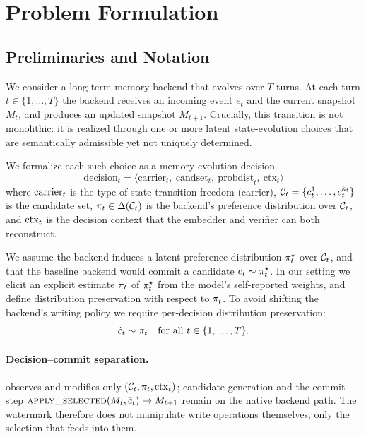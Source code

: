 
\section{Problem Formulation}
\label{sec:problem}

\subsection{Preliminaries and Notation}
\label{sec:problem-prelim}
We consider a long-term memory backend that evolves over $T$ turns.
At each turn $t\in\{1,\ldots,T\}$ the backend receives an incoming event
$e_t$ and the current snapshot $M_t$, and produces an updated snapshot
$M_{t+1}$. Crucially, this transition is not monolithic: it is realized
through one or more latent state-evolution choices that are semantically
admissible yet not uniquely determined.

We formalize each such choice as a memory-evolution decision
\begin{equation}
\mathrm{decision}_{t} = \langle \mathrm{carrier}_{t},\ \mathrm{candset}_{t},\ \mathrm{probdist}_{t},\ \mathrm{ctx}_{t} \rangle
\end{equation}
where $\mathrm{carrier}_t$ is the type of state-transition freedom (carrier),
$\mathcal{C}_{t}=\{c_{t}^{1},\ldots,c_{t}^{k_{t}}\}$ is the candidate set,
$\pi_t\in\Delta(\mathcal{C}_t)$ is the backend's preference distribution
over $\mathcal{C}_t$, and $\mathrm{ctx}_t$ is the decision context that the embedder
and verifier can both reconstruct.

We assume the backend induces a latent preference distribution
$\pi_t^\star$ over $\mathcal{C}_t$, and that the baseline backend would
commit a candidate $c_t\sim\pi_t^\star$. In our setting we elicit an
explicit estimate $\pi_t$ of $\pi_t^\star$ from the model's
self-reported weights, and define distribution preservation with respect
to $\pi_t$. To avoid shifting the backend's writing policy we require
per-decision distribution preservation:
\begin{equation}
\hat c_t \sim \pi_t \quad \text{for all } t\in\{1,\ldots,T\}.
\end{equation}

\paragraph{Decision--commit separation.}
\memmark{} observes and modifies only $(\mathcal{C}_t, \pi_t, \mathrm{ctx}_t)$;
candidate generation and the commit step
$\textsc{apply\_selected}(M_t,\hat c_t)\to M_{t+1}$ remain on the native
backend path. The watermark therefore does not manipulate write operations
themselves, only the selection that feeds into them.


